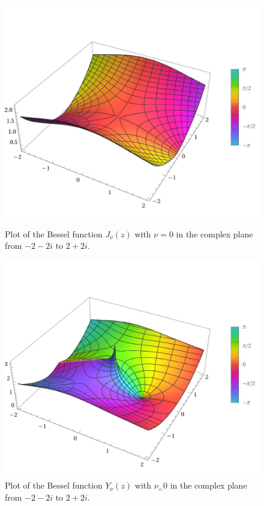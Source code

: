 \begin{figure}[!htb]
    \centering
    \begin{minipage}{.5\textwidth}
        \centering
        \includegraphics[width=\linewidth]{Images/Bessel/bessel_j_0_z.png}
        \captionsetup{width=0.9\linewidth} %
        \caption{Plot of the Bessel function \(J_\nu(z)\) with \(\nu=0\) in the complex plane from \(-2-2i\) to \(2+2i\).}
        \label{bessel_function_j_complex_plot}
    \end{minipage}%
    \begin{minipage}{.5\textwidth}
        \centering
        \includegraphics[width=\linewidth]{Images/Bessel/bessel_y_0_z.png}
        \captionsetup{width=0.9\linewidth} %
        \caption{Plot of the Bessel function \(Y_\nu(z)\) with \(\nu_=0\) in the complex plane from \(-2-2i\) to \(2+2i\).}
        \label{bessel_function_y_complex_plot}
    \end{minipage}
\end{figure}

